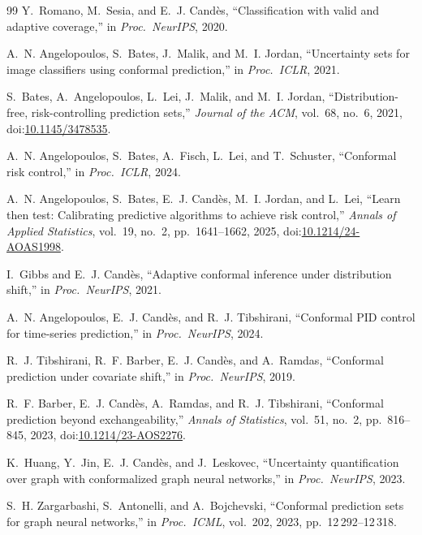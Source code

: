 \documentclass{ieeeaccess}
\begin{document}
\begin{thebibliography}{99}
Y.~Romano, M.~Sesia, and E.~J. Cand\`{e}s,
``Classification with valid and adaptive coverage,''
in \emph{Proc.\ NeurIPS}, 2020.

A.~N. Angelopoulos, S.~Bates, J.~Malik, and M.~I. Jordan,
``Uncertainty sets for image classifiers using conformal prediction,''
in \emph{Proc.\ ICLR}, 2021.

S.~Bates, A.~Angelopoulos, L.~Lei, J.~Malik, and M.~I. Jordan,
``Distribution-free, risk-controlling prediction sets,''
\emph{Journal of the ACM}, vol.~68, no.~6, 2021, doi:\href{https://doi.org/10.1145/3478535}{10.1145/3478535}.

A.~N. Angelopoulos, S.~Bates, A.~Fisch, L.~Lei, and T.~Schuster,
``Conformal risk control,''
in \emph{Proc.\ ICLR}, 2024.

A.~N. Angelopoulos, S.~Bates, E.~J. Cand\`{e}s, M.~I. Jordan, and L.~Lei,
``Learn then test: Calibrating predictive algorithms to achieve risk
control,''
\emph{Annals of Applied Statistics}, vol.~19, no.~2, pp.~1641--1662, 2025,
doi:\href{https://doi.org/10.1214/24-AOAS1998}{10.1214/24-AOAS1998}.

I.~Gibbs and E.~J. Cand\`{e}s,
``Adaptive conformal inference under distribution shift,''
in \emph{Proc.\ NeurIPS}, 2021.

A.~N. Angelopoulos, E.~J. Cand\`{e}s, and R.~J. Tibshirani,
``Conformal PID control for time-series prediction,''
in \emph{Proc.\ NeurIPS}, 2024.

R.~J. Tibshirani, R.~F. Barber, E.~J. Cand\`{e}s, and A.~Ramdas,
``Conformal prediction under covariate shift,''
in \emph{Proc.\ NeurIPS}, 2019.

R.~F. Barber, E.~J. Cand\`{e}s, A.~Ramdas, and R.~J. Tibshirani,
``Conformal prediction beyond exchangeability,''
\emph{Annals of Statistics}, vol.~51, no.~2, pp.~816--845, 2023,
doi:\href{https://doi.org/10.1214/23-AOS2276}{10.1214/23-AOS2276}.

K.~Huang, Y.~Jin, E.~J. Cand\`{e}s, and J.~Leskovec,
``Uncertainty quantification over graph with conformalized graph neural
networks,''
in \emph{Proc.\ NeurIPS}, 2023.

S.~H. Zargarbashi, S.~Antonelli, and A.~Bojchevski,
``Conformal prediction sets for graph neural networks,''
in \emph{Proc.\ ICML}, vol.~202, 2023, pp.~12\,292--12\,318.


\end{thebibliography}
\end{document}
